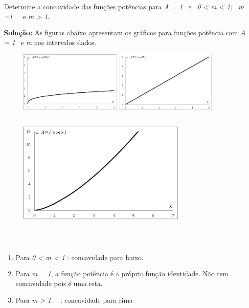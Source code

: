 \begin{texemplo}
	
Determine a concavidade das funções potências para \textit{A = 1}~ e~ \textit{0 < m < 1;~ m =1}~~~e  \textit{m > 1}. 

\textbf{Solução:} As figuras abaixo apresentam os gráficos para funções potência com \textit{A = 1}~ e  \textit{m} nos intervalos dados. 

\begin{figure}[H]	
	\includegraphics[width=0.45\textwidth]{capitulos/outras_funcoes/media/image5.png} \includegraphics[width=0.45\textwidth]{capitulos/outras_funcoes/media/image6.png}
\end{figure}

\begin{figure}[H]
	\begin{Center}
		\includegraphics[width=3.3in,height=2.29in]{capitulos/outras_funcoes/media/image7.png}
	\end{Center}
\end{figure}

~~

\begin{enumerate}
	\item Para  \textit{0 < m < 1} : concavidade para baixo.

	\item Para \textit{m = 1}, a função potência é a própria função identidade. Não tem concavidade pois é uma reta.
	
	\item Para \textit{m > 1}~~ : concavidade para cima \qedsymbol{}  
\end{enumerate}
\end{texemplo}

